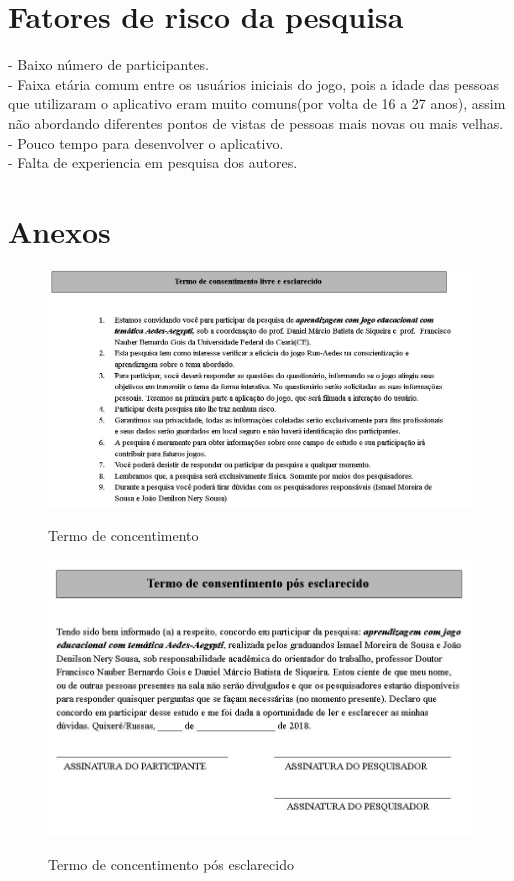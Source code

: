\documentclass[12pt]{article}
\begin{document}
	\section{Fatores de risco da pesquisa}
		- Baixo número de participantes.\\
		- Faixa etária comum entre os usuários iniciais do jogo, pois a idade das pessoas que utilizaram o aplicativo eram muito comuns(por volta de 16 a 27 anos), assim não abordando diferentes pontos de vistas de pessoas mais novas ou mais velhas.\\
		- Pouco tempo para desenvolver o aplicativo.\\
		- Falta de experiencia em pesquisa dos autores.\\
		
	\section{Anexos} 
	\begin{figure}[H]
		\centering
		\caption{Termo de concentimento}
		\includegraphics[width=0.7\linewidth]{"Figuras/Figure_1"}
		\label{fig:termo-de-concentimento}
	\end{figure}

	\begin{figure}[H]
		\centering
		\caption{Termo de concentimento pós esclarecido}
		\includegraphics[width=0.7\linewidth]{"Figuras/Figure_2"}
		\label{fig:termo-de-concentimento-pos-esclarecido}
	\end{figure}
	
\end{document}
